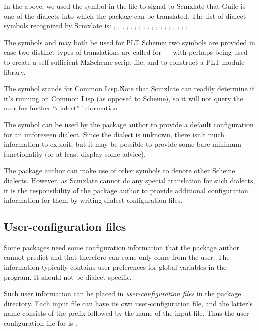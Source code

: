 In the above, we used the symbol  in the
 file to signal to
Scmxlate that Guile is one of the dialects into which
the package can be translated.  The list of dialect symbols
recognized by Scmxlate is: , ,
,
, , , , ,
, , , , ,
, , , , ,
.

The symbols  and 
may both be used for PLT Scheme: two symbols are
provided in case two distinct types of translations are
called for --- with  perhaps being used to create a
self-sufficient MzScheme script file, and  to construct a
PLT module library.

The symbol  stands  for
Common Lisp.\f{Note that
Scmxlate can readily determine if it's running
on Common Lisp (as opposed to Scheme), so it will not query the user
for further ``dialect'' information.}

The symbol  can be used by the package author
to provide a default configuration for an unforeseen
dialect.  Since the dialect is unknown, there isn't
much information to exploit, but it may be
possible to provide some bare-minimum functionality
(or at least display some advice).

The package author can make use of other symbols to
denote other Scheme dialects.  However, as Scmxlate
cannot do any special translation for such dialects, it
is the responsibility of the package author to provide
additional configuration information for them by
writing dialect-configuration files.

\subsection{User-configuration files}

Some packages need some configuration information that
the package author cannot predict and that therefore
can come only come from the user.  The information
typically contains user preferences for global
variables in the program.  It should not be
dialect-specific.

Such user information can be placed in {\em
user-configuration files} in the package directory.
Each input file can have its own
user-configuration file, and the latter's name
consists of the prefix  followed by the
name of the input file.  Thus the user configuration
file for  is .

